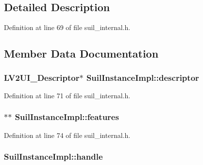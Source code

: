 \subsection{Detailed Description}


Definition at line 69 of file suil\+\_\+internal.\+h.



\subsection{Member Data Documentation}
\subsubsection[{\texorpdfstring{descriptor}{descriptor}}]{ {\bf L\+V2\+U\+I\+\_\+\+Descriptor}$\ast$ Suil\+Instance\+Impl\+::descriptor}\hypertarget{struct_suil_instance_impl_a8270f346a69df6eb684aed10ffb82302}{}\label{struct_suil_instance_impl_a8270f346a69df6eb684aed10ffb82302}


Definition at line 71 of file suil\+\_\+internal.\+h.

\subsubsection[{\texorpdfstring{features}{features}}]{$\ast$$\ast$ Suil\+Instance\+Impl\+::features}\hypertarget{struct_suil_instance_impl_ac4b02a3e25c5c0db85dca79a86ccca1b}{}\label{struct_suil_instance_impl_ac4b02a3e25c5c0db85dca79a86ccca1b}


Definition at line 74 of file suil\+\_\+internal.\+h.

\subsubsection[{\texorpdfstring{handle}{handle}}]{ Suil\+Instance\+Impl\+::handle}\hypertarget{struct_suil_instance_impl_a27fd779e1ff9248a50cf00dcdbef89c8}{}\label{struct_suil_instance_impl_a27fd779e1ff9248a50cf00dcdbef89c8}



